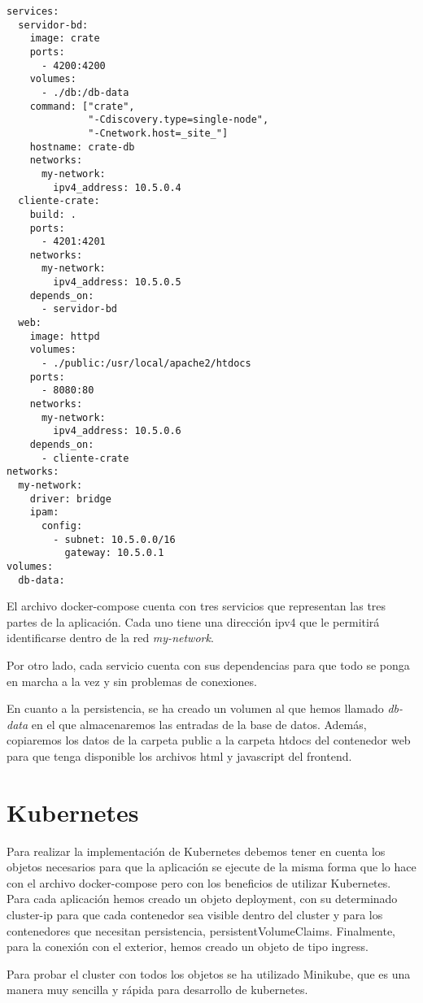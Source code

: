 \documentclass[12pt]{article}
\begin{document}
\begin{lstlisting}[caption={Archivo docker-compose.yml}, captionpos=b]
services:
  servidor-bd:
    image: crate
    ports:
      - 4200:4200
    volumes:
      - ./db:/db-data
    command: ["crate",
              "-Cdiscovery.type=single-node",
              "-Cnetwork.host=_site_"]
    hostname: crate-db
    networks:
      my-network:
        ipv4_address: 10.5.0.4
  cliente-crate:
    build: .
    ports:
      - 4201:4201
    networks:
      my-network:
        ipv4_address: 10.5.0.5
    depends_on:
      - servidor-bd
  web:
    image: httpd
    volumes:
      - ./public:/usr/local/apache2/htdocs
    ports:
      - 8080:80
    networks:
      my-network:
        ipv4_address: 10.5.0.6
    depends_on:
      - cliente-crate
networks:
  my-network:
    driver: bridge
    ipam:
      config:
        - subnet: 10.5.0.0/16
          gateway: 10.5.0.1
volumes:
  db-data:
\end{lstlisting}

El archivo docker-compose cuenta con tres servicios que representan las tres partes de
la aplicación. Cada uno tiene una dirección ipv4 que le permitirá identificarse dentro
de la red \emph{my-network}.

Por otro lado, cada servicio cuenta con sus dependencias para que todo se ponga en marcha
a la vez y sin problemas de conexiones.

En cuanto a la persistencia, se ha creado un volumen al que hemos llamado \emph{db-data} en
el que almacenaremos las entradas de la base de datos. Además, copiaremos los datos de la carpeta
public a la carpeta htdocs del contenedor web para que tenga disponible los archivos html
y javascript del frontend.

\section{Kubernetes}
Para realizar la implementación de Kubernetes debemos tener en cuenta los objetos necesarios
para que la aplicación se ejecute de la misma forma que lo hace con el archivo docker-compose
pero con los beneficios de utilizar Kubernetes. Para cada aplicación hemos creado un objeto
deployment, con su determinado cluster-ip para que cada contenedor sea visible dentro del cluster
y para los contenedores que necesitan persistencia, persistentVolumeClaims. Finalmente, para la 
conexión con el exterior, hemos creado un objeto de tipo ingress.

Para probar el cluster con todos los objetos se ha utilizado Minikube, que es una manera muy sencilla
y rápida para desarrollo de kubernetes.
\end{document}
